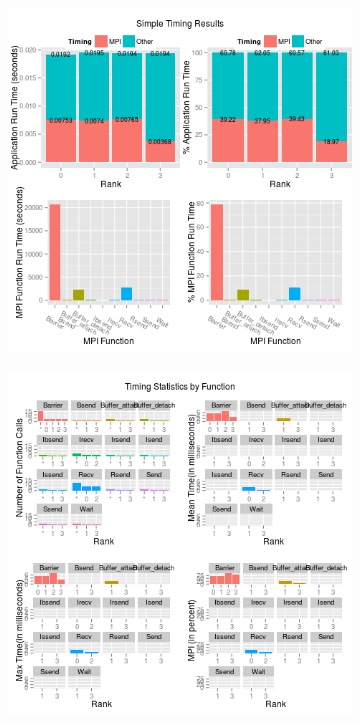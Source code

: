 \begin{figure}
        \centering
        \begin{subfigure}[b]{0.485\textwidth}
            \includegraphics[width=\textwidth]{include/pics/mpip/01_timing}
        \end{subfigure}%
        \hspace{.2cm}
        \begin{subfigure}[b]{0.485\textwidth}
            \includegraphics[width=\textwidth]{include/pics/mpip/02_stats}

\end{subfigure}
\end{figure}
